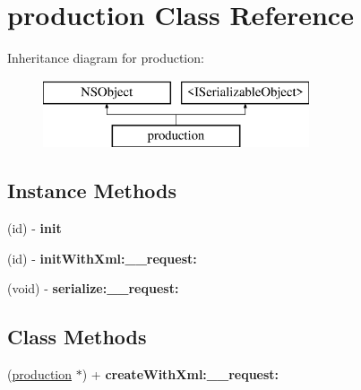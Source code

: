 \hypertarget{interfaceproduction}{}\section{production Class Reference}
\label{interfaceproduction}
Inheritance diagram for production\+:\begin{figure}[H]
\begin{center}
\leavevmode
\includegraphics[height=2.000000cm]{interfaceproduction}
\end{center}
\end{figure}
\subsection*{Instance Methods}
\begin{DoxyCompactItemize}
\item 
\hypertarget{interfaceproduction_ab0bcd70f0816b7d12c59700707d802a2}{}(id) -\/ {\bfseries init}\label{interfaceproduction_ab0bcd70f0816b7d12c59700707d802a2}

\item 
\hypertarget{interfaceproduction_a54a5408741d14511011c1e9fa88384ab}{}(id) -\/ {\bfseries init\+With\+Xml\+:\+\_\+\+\_\+request\+:}\label{interfaceproduction_a54a5408741d14511011c1e9fa88384ab}

\item 
\hypertarget{interfaceproduction_a4858dc06ea97c1a5f882dcefdc536a34}{}(void) -\/ {\bfseries serialize\+:\+\_\+\+\_\+request\+:}\label{interfaceproduction_a4858dc06ea97c1a5f882dcefdc536a34}

\end{DoxyCompactItemize}
\subsection*{Class Methods}
\begin{DoxyCompactItemize}
\item 
\hypertarget{interfaceproduction_ac81acd94ca9728a286ad24be5543368a}{}(\hyperlink{interfaceproduction}{production} $\ast$) + {\bfseries create\+With\+Xml\+:\+\_\+\+\_\+request\+:}\label{interfaceproduction_ac81acd94ca9728a286ad24be5543368a}

\end{DoxyCompactItemize}
